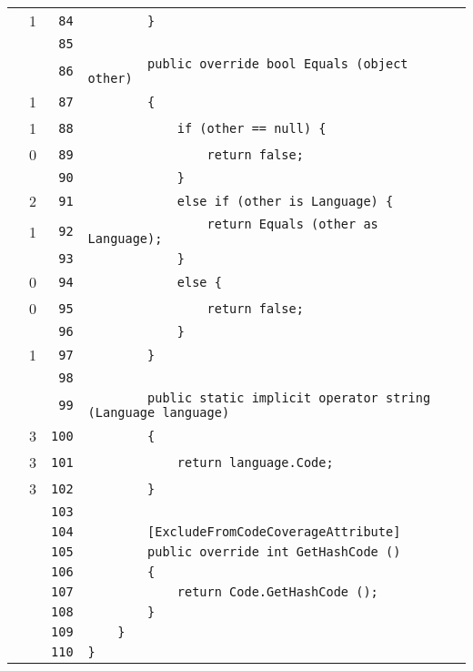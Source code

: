 \documentclass[a4paper,10pt]{article}
\begin{document}
\begin{longtable}[l]{lrrl}
\cellcolor{green} & 1 & \verb~84~ & \verb~        }~\\
\cellcolor{gray} &  & \verb~85~ & \verb~~\\
\cellcolor{gray} &  & \verb~86~ & \verb~        public override bool Equals (object other)~\\
\cellcolor{green} & 1 & \verb~87~ & \verb~        {~\\
\cellcolor{green} & 1 & \verb~88~ & \verb~            if (other == null) {~\\
\cellcolor{red} & 0 & \verb~89~ & \verb~                return false;~\\
\cellcolor{gray} &  & \verb~90~ & \verb~            }~\\
\cellcolor{green} & 2 & \verb~91~ & \verb~            else if (other is Language) {~\\
\cellcolor{green} & 1 & \verb~92~ & \verb~                return Equals (other as Language);~\\
\cellcolor{gray} &  & \verb~93~ & \verb~            }~\\
\cellcolor{red} & 0 & \verb~94~ & \verb~            else {~\\
\cellcolor{red} & 0 & \verb~95~ & \verb~                return false;~\\
\cellcolor{gray} &  & \verb~96~ & \verb~            }~\\
\cellcolor{green} & 1 & \verb~97~ & \verb~        }~\\
\cellcolor{gray} &  & \verb~98~ & \verb~~\\
\cellcolor{gray} &  & \verb~99~ & \verb~        public static implicit operator string (Language language)~\\
\cellcolor{green} & 3 & \verb~100~ & \verb~        {~\\
\cellcolor{green} & 3 & \verb~101~ & \verb~            return language.Code;~\\
\cellcolor{green} & 3 & \verb~102~ & \verb~        }~\\
\cellcolor{gray} &  & \verb~103~ & \verb~~\\
\cellcolor{gray} &  & \verb~104~ & \verb~        [ExcludeFromCodeCoverageAttribute]~\\
\cellcolor{gray} &  & \verb~105~ & \verb~        public override int GetHashCode ()~\\
\cellcolor{gray} &  & \verb~106~ & \verb~        {~\\
\cellcolor{gray} &  & \verb~107~ & \verb~            return Code.GetHashCode ();~\\
\cellcolor{gray} &  & \verb~108~ & \verb~        }~\\
\cellcolor{gray} &  & \verb~109~ & \verb~    }~\\
\cellcolor{gray} &  & \verb~110~ & \verb~}~\\
\end{longtable}
\newpage
\end{document}

